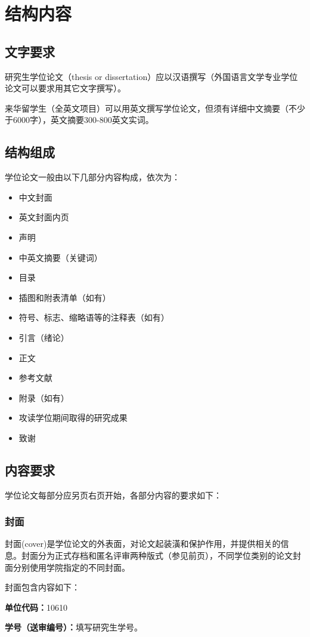 
\chapter{结构内容}
\section{文字要求}
研究生学位论文（thesis or dissertation）应以汉语撰写（外国语言文学专业学位论文可以要求用其它文字撰写）。

来华留学生（全英文项目）可以用英文撰写学位论文，但须有详细中文摘要（不少于6000字），英文摘要300-800英文实词。
\section{结构组成}
学位论文一般由以下几部分内容构成，依次为：
\begin{itemize}
\item	中文封面 
\item	英文封面内页
\item	声明
\item	中英文摘要（关键词） 
\item	目录
\item	插图和附表清单（如有）
\item	符号、标志、缩略语等的注释表（如有）
\item	引言（绪论）
\item	正文
\item	参考文献
\item	附录（如有）
\item	攻读学位期间取得的研究成果
\item	致谢
\end{itemize}
\section{内容要求}
学位论文每部分应另页右页开始，各部分内容的要求如下：
\subsection{封面}
封面(cover)是学位论文的外表面，对论文起装潢和保护作用，并提供相关的信息。封面分为正式存档和匿名评审两种版式（参见前页），不同学位类别的论文封面分别使用学院指定的不同封面。

封面包含内容如下：

\textbf{单位代码：}10610

\textbf{学号（送审编号）：}填写研究生学号。


